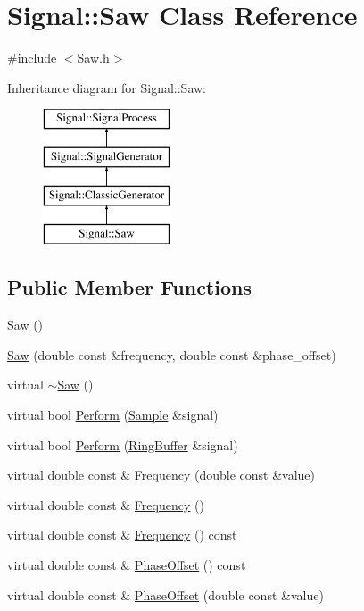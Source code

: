 \hypertarget{classSignal_1_1Saw}{\section{Signal\+:\+:Saw Class Reference}
\label{classSignal_1_1Saw}
}


{\ttfamily \#include $<$Saw.\+h$>$}

Inheritance diagram for Signal\+:\+:Saw\+:\begin{figure}[H]
\begin{center}
\leavevmode
\includegraphics[height=4.000000cm]{classSignal_1_1Saw}
\end{center}
\end{figure}
\subsection*{Public Member Functions}
\begin{DoxyCompactItemize}
\item 
\hyperlink{classSignal_1_1Saw_a4bce6f687d2bd26aa3c2fb209de4c9f9}{Saw} ()
\item 
\hyperlink{classSignal_1_1Saw_a6d772ec845a8c98a4111a7bf1ddabb10}{Saw} (double const \&frequency, double const \&phase\+\_\+offset)
\item 
virtual \hyperlink{classSignal_1_1Saw_a1663e993e22dd1f66033c4de1c1007e9}{$\sim$\+Saw} ()
\item 
virtual bool \hyperlink{classSignal_1_1Saw_a6fb3216b94fea4daa83b27f5de194fa0}{Perform} (\hyperlink{classSignal_1_1Sample}{Sample} \&signal)
\item 
virtual bool \hyperlink{classSignal_1_1Saw_a0d0d374c9b5a3f73f48e9fb1c444b0ca}{Perform} (\hyperlink{classSignal_1_1RingBuffer}{Ring\+Buffer} \&signal)
\item 
virtual double const \& \hyperlink{classSignal_1_1Saw_af91fd0d15b380c02e309705eaad46efd}{Frequency} (double const \&value)
\item 
virtual double const \& \hyperlink{classSignal_1_1Saw_acf3fd0346394d9fd2690bb5fee9550f6}{Frequency} ()
\item 
virtual double const \& \hyperlink{classSignal_1_1SignalGenerator_a96af42ee68f94e9b04d034fd68b73ecd}{Frequency} () const 
\item 
virtual double const \& \hyperlink{classSignal_1_1SignalGenerator_ac2538ec946f001e394d2416fda698d1c}{Phase\+Offset} () const 
\item 
virtual double const \& \hyperlink{classSignal_1_1SignalGenerator_ac6a103ff72beaa338f6d18c812522d78}{Phase\+Offset} (double const \&value)
\end{DoxyCompactItemize}

